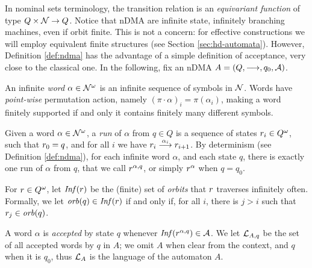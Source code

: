 In nominal sets terminology, the transition relation is an \emph{equivariant function} of type $Q \times \mathcal{N} \to Q$.  Notice that nDMA are infinite state, infinitely branching machines, even if orbit finite. This is not a concern: for effective constructions we will employ equivalent finite structures (see Section \ref{sec:hd-automata}). However, Definition \ref{def:ndma} has the advantage of a simple definition of acceptance, very close to the classical one. In the following, fix an nDMA $A=(Q,\overset{}{\longrightarrow},q_0,\mathcal{A})$.

\begin{definition}
 An infinite \emph{word} $\alpha \in \mathcal{N}^\omega$ is an infinite sequence of symbols in $\mathcal{N}$. Words have \emph{point-wise} permutation action, namely $(\pi \cdot \alpha)_i = \pi(\alpha_i)$, making a word finitely supported if and only it contains finitely many different symbols. 
\end{definition}

\begin{definition}\label{def:nominal-run}
 Given a word $\alpha \in \mathcal{N}^\omega$, a \emph{run} of $\alpha$ from $q \in Q$ is a sequence of states $r_i \in Q^\omega$, such that $r_0 = q$, and for all $i$ we have $r_i \overset{\alpha_i}{\longrightarrow} r_{i+1}$. 
 By determinism (see Definition \ref{def:ndma}), for each infinite word $\alpha$, and each state $q$, there is exactly one run of $\alpha$ from $q$, that we call $r^{\alpha,q}$, or simply $r^{\alpha}$ when $q=q_0$.
\end{definition}

\begin{definition}\label{def:inf-set}
 For $r \in Q^\omega$, let $\mathit{Inf}(r)$ be the (finite) set of \emph{orbits} that $r$ traverses infinitely often. Formally, we let $\mathit{orb}(q) \in \mathit{Inf}(r)$ if and only if, for all $i$, there is $j > i$ such that $r_j \in \mathit{orb}(q)$.
\end{definition}

\begin{definition}
 A word $\alpha$ is \emph{accepted} by state $q$ whenever $\mathit{Inf}(r^{\alpha,q}) \in \mathcal{A}$. We let $\mathcal{L}_{A,q}$ be the set of all accepted words by $q$ in $A$; we omit $A$ when clear from the context, and $q$ when it is $q_0$, thus $\mathcal{L}_A$ is the language of the automaton $A$.
\end{definition}

